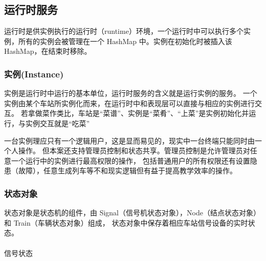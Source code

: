 \subsection{运行时服务}
运行时是供实例执行的运行时（runtime）环境，一个运行时中可以执行多个实例，所有的实例会被管理在一个
HashMap 中。实例在初始化时被插入该HashMap，在结束时移除。

\subsubsection{实例(Instance)}
实例是运行时中运行的基本单位，运行时服务的含义就是运行实例的服务。
一个实例由某个车站所实例化而来，在运行时中和表现层可以直接与相应的实例进行交互。
若拿做菜作类比，车站是“菜谱”、实例是“菜肴”、“上菜”是实例初始化并运行，与实例交互就是“吃菜”

一台实例理应只有一个逻辑用户，这是显而易见的，现实中一台终端只能同时由一个人操作。
但本案还支持管理员控制和状态共享。管理员控制是允许管理员对任意一个运行中的实例进行最高权限的操作，
包括普通用户的所有权限还有设置隐患（故障），任意生成列车等不和现实逻辑但有益于提高教学效率的操作。

\subsubsection{状态对象}
状态对象是状态机的组件，由 Signal（信号机状态对象），Node（结点状态对象） 和 Train（车辆状态对象）组成，
状态对象中保存着相应车站信号设备的实时状态。

\paragraph{}信号状态


